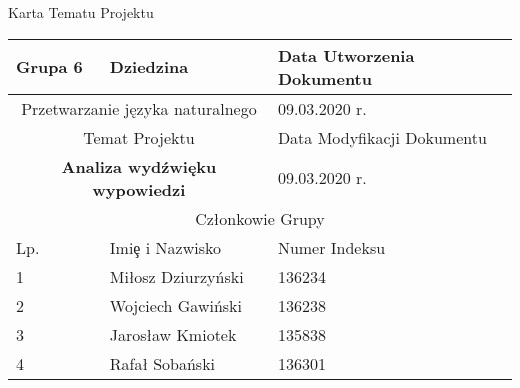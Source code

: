 \documentclass[11pt,a4paper]{article}
\begin{document}
\begin{center}
    \Large
    Karta Tematu Projektu
\end{center}
\begin{table}[h]
    \centering
    \begin{tabular}{|p{3cm}|p{5cm}|p{5cm}|}
         \hline
         Grupa 6 & Dziedzina & Data Utworzenia Dokumentu \\ \hline
        \multicolumn{2}{|c|}{Przetwarzanie języka naturalnego} & 09.03.2020 r. \\ \hline
         \multicolumn{2}{|c|}{Temat Projektu} & Data Modyfikacji Dokumentu \\ \hline
         \multicolumn{2}{|c|}{\textbf{Analiza wydźwięku wypowiedzi}} & 09.03.2020 r. \\ \hline
         \multicolumn{3}{|c|}{Członkowie Grupy} \\ \hline
         Lp. & Imi\c e i Nazwisko & Numer Indeksu \\ \hline     
         1 & Miłosz Dziurzyński & 136234 \\ \hline
         2 & Wojciech Gawiński & 136238 \\ \hline
         3 & Jarosław Kmiotek & 135838 \\ \hline
         4 & Rafał Sobański & 136301 \\ \hline
    \end{tabular}
    \label{tab:my_label}
\end{table}
\end{document}
